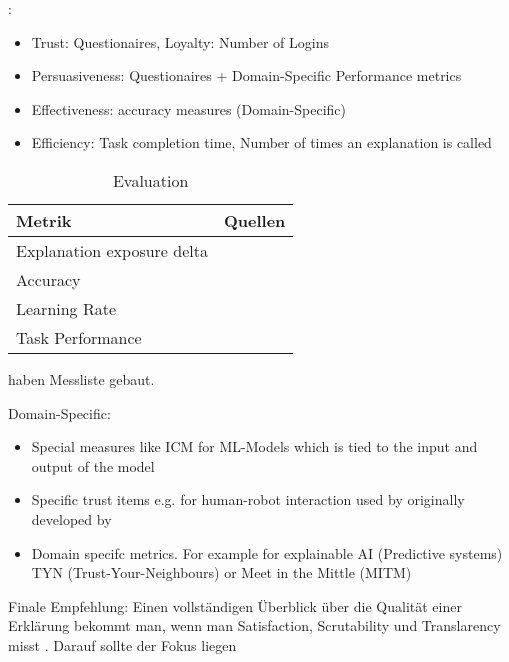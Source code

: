 \cite{tintarev2007survey}:

\begin{itemize}
    \item Trust: Questionaires, Loyalty: Number of Logins
    \item Persuasiveness: Questionaires + Domain-Specific Performance metrics
    \item  Effectiveness: accuracy measures (Domain-Specific) 
    \item Efficiency: Task completion time, Number of times an explanation is called
\end{itemize}

\begin{table}[htb!]
    \begin{center}
        \begin{tabular}{|p{}|p{}|}
            \hline
            \textbf{Metrik} & \textbf{Quellen} \\ \hline
            Explanation exposure delta & \\
            Accuracy                          & \cite{tintarev_designing_nodate}
                                                            \cite{waa_evaluating_2021} \cite{mucha_interfaces_2021}
                                                            \cite{kunkel_let_2019} \cite{zolotas_towards_2019} \\
            Learning Rate                     & \cite{tintarev_designing_nodate} \cite{gunning2019darpa} \\
            Task Performance                  & \cite{waa_evaluating_2021}  \cite{mucha_interfaces_2021}  
                                                            \cite{abdulrahman_belief-based_2019} 
                                                            \cite{zolotas_towards_2019} \cite{martin_developing_2019} 
                                                            \cite{martin_evaluating_2021} \cite{gunning2019darpa} \\
            \hline
        \end{tabular}
    \end{center}
    \caption{Evaluation}
    \label{tab:evaluation_of_explanations}
\end{table}

\cite{tintarev_designing_nodate} haben Messliste gebaut.

Domain-Specific:

\begin{itemize}
    \item Special measures like ICM for ML-Models which is tied to the input and output of the model \cite{waa_evaluating_2021, neerincx_using_2018}
    \item Specific trust items e.g. for human-robot interaction used by \cite{zhu_effects_2020} originally developed by \cite{schaefer2013perception}
    \item 
    Domain specifc metrics. For example for explainable AI (Predictive systems) TYN (Trust-Your-Neighbours) or Meet in the Mittle (MITM) \cite{martin_evaluating_2021}
\end{itemize}


Finale Empfehlung: Einen vollständigen Überblick über die Qualität einer Erklärung bekommt man, wenn man Satisfaction, Scrutability und Translarency misst \cite{balog_measuring_2020}. Darauf sollte der Fokus liegen